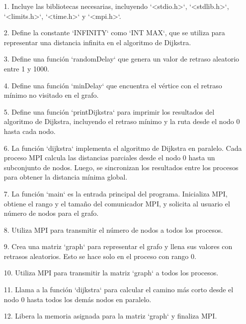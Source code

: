 \documentclass[a4paper,12pt]{article}
\begin{document}
\begin{itemize}
   \item[1.] Incluye las bibliotecas necesarias, incluyendo `<stdio.h>`, `<stdlib.h>`, `<limits.h>`, `<time.h>` y `<mpi.h>`.

   \item[2.] Define la constante `INFINITY` como `INT MAX`, que se utiliza para representar una distancia infinita en el algoritmo de Dijkstra.

   \item[3.] Define una función `randomDelay` que genera un valor de retraso aleatorio entre 1 y 1000.

   \item[4.] Define una función `minDelay` que encuentra el vértice con el retraso mínimo no visitado en el grafo.

   \item[5.] Define una función `printDijkstra` para imprimir los resultados del algoritmo de Dijkstra, incluyendo el retraso mínimo y la ruta desde el nodo 0 hasta cada nodo.

   \item[6.] La función `dijkstra` implementa el algoritmo de Dijkstra en paralelo. Cada proceso MPI calcula las distancias parciales desde el nodo 0 hasta un subconjunto de nodos. Luego, se sincronizan los resultados entre los procesos para obtener la distancia mínima global.

   \item[7.] La función `main` es la entrada principal del programa. Inicializa MPI, obtiene el rango y el tamaño del comunicador MPI, y solicita al usuario el número de nodos para el grafo.

   \item[8.] Utiliza MPI para transmitir el número de nodos a todos los procesos.

   \item[9.] Crea una matriz `graph` para representar el grafo y llena sus valores con retrasos aleatorios. Esto se hace solo en el proceso con rango 0.

   \item[10.] Utiliza MPI para transmitir la matriz `graph` a todos los procesos.

   \item[11.] Llama a la función `dijkstra` para calcular el camino más corto desde el nodo 0 hasta todos los demás nodos en paralelo.

   \item[12.] Libera la memoria asignada para la matriz `graph` y finaliza MPI.
\end{itemize}
\end{document}
